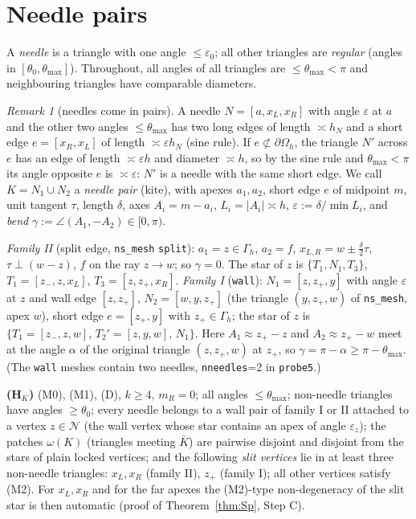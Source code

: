 \documentclass[11pt]{article}
\theoremstyle{remark}
\newtheorem{remark}[theorem]{Remark}
\newcommand{\Nset}{\mathcal N}
\begin{document}
\section{Needle pairs}\label{sec:pairs}
A \emph{needle} is a triangle with one angle $\le\varepsilon_0$; all other triangles are \emph{regular} (angles in $[\theta_0,\theta_{\max}]$).
Throughout, all angles of all triangles are $\le\theta_{\max}<\pi$ and neighbouring triangles have comparable diameters.
\begin{remark}[needles come in pairs]\label{obs:pairs}
A needle $N=[a,x_L,x_R]$ with angle $\varepsilon$ at $a$ and the other two angles $\le\theta_{\max}$ has two long edges of length $\asymp h_N$ and a
short edge $e=[x_R,x_L]$ of length $\asymp\varepsilon h_N$ (sine rule). If $e\not\subset\partial\Omega_h$, the triangle $N'$ across $e$ has an edge of length
$\asymp\varepsilon h$ and diameter $\asymp h$, so by the sine rule and $\theta_{\max}<\pi$ its angle opposite $e$ is $\asymp\varepsilon$: $N'$ is a needle with the
same short edge. We call $K=N_1\cup N_2$ a \emph{needle pair} (kite), with apexes $a_1,a_2$, short edge $e$ of midpoint $m$, unit tangent $\tau$,
length $\delta$, axes $A_i=m-a_i$, $L_i=|A_i|\asymp h$, $\varepsilon:=\delta/\min L_i$, and \emph{bend} $\gamma:=\angle(A_1,-A_2)\in[0,\pi)$.
\end{remark}
\emph{Family II} (split edge, \texttt{ns\_mesh} \texttt{split}): $a_1=z\in\Gamma_h$, $a_2=f$, $x_{L,R}=w\pm\frac\delta2\tau$, $\tau\perp(w-z)$,
$f$ on the ray $z\to w$; so $\gamma=0$. The star of $z$ is $\{T_1,N_1,T_3\}$, $T_1=[z_-,z,x_L]$, $T_3=[z,z_+,x_R]$.
\emph{Family I} (\texttt{wall}): $N_1=[z,z_+,y]$ with angle $\varepsilon$ at $z$ and wall edge $[z,z_+]$, $N_2=[w,y,z_+]$ (the triangle $(y,z_+,w)$ of
\texttt{ns\_mesh}, apex $w$), short edge $e=[z_+,y]$ with $z_+\in\Gamma_h$; the star of $z$ is $\{T_1=[z_-,z,w],\,T_2'=[z,y,w],\,N_1\}$.
Here $A_1\approx z_+-z$ and $A_2\approx z_+-w$ meet at the angle $\alpha$ of the original triangle $(z,z_+,w)$ at $z_+$, so
$\gamma=\pi-\alpha\ge\pi-\theta_{\max}$. (The \texttt{wall} meshes contain two needles, \texttt{nneedles}=2 in \texttt{probe5}.)

\textbf{(H$_K$)} (M0), (M1), (D), $k\ge4$, $m_R=0$; all angles $\le\theta_{\max}$; non-needle triangles have angles $\ge\theta_0$; every needle
belongs to a wall pair of family I or II attached to a vertex $z\in\Nset$ (the wall vertex whose star contains an apex of angle $\varepsilon_z$);
the patches $\omega(K)$ (triangles meeting $\bar K$) are pairwise disjoint and disjoint from the stars of plain locked vertices;
and the following \emph{slit vertices} lie in at least three non-needle triangles: $x_L,x_R$ (family II), $z_+$ (family I);
all other vertices satisfy (M2). For $x_L,x_R$ and for the far apexes the (M2)-type non-degeneracy of the slit star is
then automatic (proof of Theorem~\ref{thm:Sp}, Step C).
\end{document}
